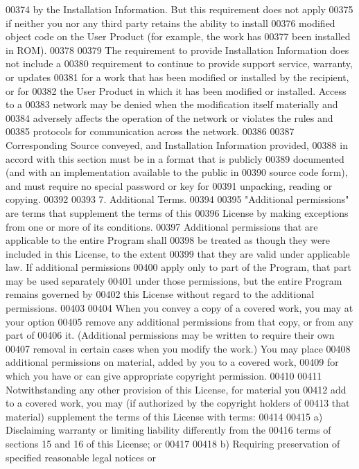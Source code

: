 \begin{DoxyCode}
00374 by the Installation Information.  But this requirement does not apply
00375 if neither you nor any third party retains the ability to install
00376 modified object code on the User Product (for example, the work has
00377 been installed in ROM).
00378 
00379   The requirement to provide Installation Information does not include a
00380 requirement to continue to provide support service, warranty, or updates
00381 for a work that has been modified or installed by the recipient, or for
00382 the User Product in which it has been modified or installed.  Access to a
00383 network may be denied when the modification itself materially and
00384 adversely affects the operation of the network or violates the rules and
00385 protocols for communication across the network.
00386 
00387   Corresponding Source conveyed, and Installation Information provided,
00388 in accord with this section must be in a format that is publicly
00389 documented (and with an implementation available to the public in
00390 source code form), and must require no special password or key for
00391 unpacking, reading or copying.
00392 
00393   7. Additional Terms.
00394 
00395   "Additional permissions" are terms that supplement the terms of this
00396 License by making exceptions from one or more of its conditions.
00397 Additional permissions that are applicable to the entire Program shall
00398 be treated as though they were included in this License, to the extent
00399 that they are valid under applicable law.  If additional permissions
00400 apply only to part of the Program, that part may be used separately
00401 under those permissions, but the entire Program remains governed by
00402 this License without regard to the additional permissions.
00403 
00404   When you convey a copy of a covered work, you may at your option
00405 remove any additional permissions from that copy, or from any part of
00406 it.  (Additional permissions may be written to require their own
00407 removal in certain cases when you modify the work.)  You may place
00408 additional permissions on material, added by you to a covered work,
00409 for which you have or can give appropriate copyright permission.
00410 
00411   Notwithstanding any other provision of this License, for material you
00412 add to a covered work, you may (if authorized by the copyright holders of
00413 that material) supplement the terms of this License with terms:
00414 
00415     a) Disclaiming warranty or limiting liability differently from the
00416     terms of sections 15 and 16 of this License; or
00417 
00418     b) Requiring preservation of specified reasonable legal notices or

\end{DoxyCode}
